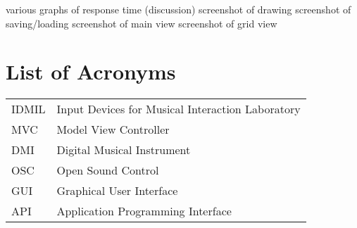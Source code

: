 \documentclass [12pt,letterpaper]{report}
\begin{document}
\tableofcontents
\listoffigures
	various graphs of response time (discussion)
	screenshot of drawing
	screenshot of saving/loading
	screenshot of main view
	screenshot of grid view
\listoftables

\newpage
\chapter*{List of Acronyms}

\begin{longtable}{ll}
    IDMIL	& 	Input Devices for Musical Interaction Laboratory\\ 
    MVC 	& 	Model View Controller\\
    DMI 	& 	Digital Musical Instrument\\
    OSC 	& 	Open Sound Control\\
    GUI		& 	Graphical User Interface\\
    API     &   Application Programming Interface
\end{longtable}

\cleardoublepage
{}

%
%
\typeout{}

%
\typeout{}

%
\typeout{}

%
\typeout{}

%
\typeout{}




%
%

\typeout{}
    \renewcommand\refname{References}
    
    
\end{document}
